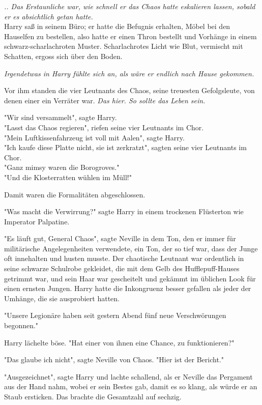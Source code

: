 {\emph{.. Das Erstaunliche war, wie schnell er das Chaos hatte eskalieren lassen, sobald er es absichtlich getan hatte.}\\ Harry saß in seinem Büro; er hatte die Befugnis erhalten, Möbel bei den Hauselfen zu bestellen, also hatte er einen Thron bestellt und Vorhänge in einem schwarz-scharlachroten Muster. Scharlachrotes Licht wie Blut, vermischt mit Schatten, ergoss sich über den Boden.

\emph{Irgendetwas in Harry fühlte sich an, als wäre er endlich nach Hause gekommen.}

Vor ihm standen die vier Leutnants des Chaos, seine treuesten Gefolgsleute, von denen einer ein Verräter war. \emph{Das hier. So sollte das Leben sein.}

"Wir sind versammelt", sagte Harry.\\ "Lasst das Chaos regieren", riefen seine vier Leutnants im Chor.\\ "Mein Luftkissenfahrzeug ist voll mit Aalen", sagte Harry.\\ "Ich kaufe diese Platte nicht, sie ist zerkratzt", sagten seine vier Leutnants im Chor.\\ "Ganz mimsy waren die Borogroves."\\ "Und die Klosterratten wühlen im Müll!"

Damit waren die Formalitäten abgeschlossen.

"Was macht die Verwirrung?" sagte Harry in einem trockenen Flüsterton wie Imperator Palpatine.

"Es läuft gut, General Chaos", sagte Neville in dem Ton, den er immer für militärische Angelegenheiten verwendete, ein Ton, der so tief war, dass der Junge oft innehalten und husten musste. Der chaotische Leutnant war ordentlich in seine schwarze Schulrobe gekleidet, die mit dem Gelb des Hufflepuff-Hauses getrimmt war, und sein Haar war gescheitelt und gekämmt im üblichen Look für einen ernsten Jungen. Harry hatte die Inkongruenz besser gefallen als jeder der Umhänge, die sie ausprobiert hatten.

"Unsere Legionäre haben seit gestern Abend fünf neue Verschwörungen begonnen."

Harry lächelte böse. "Hat einer von ihnen eine Chance, zu funktionieren?"

"Das glaube ich nicht", sagte Neville von Chaos. "Hier ist der Bericht."

"Ausgezeichnet", sagte Harry und lachte schallend, als er Neville das Pergament aus der Hand nahm, wobei er sein Bestes gab, damit es so klang, als würde er an Staub ersticken. Das brachte die Gesamtzahl auf sechzig.

}
